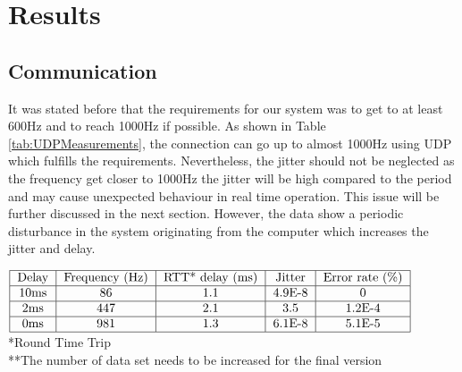 \section{Results}

\subsection{Communication}

 It was stated before that the requirements for our system was to get to at least 600Hz and to reach 1000Hz if possible. As shown in Table \ref{tab:UDPMeasurements}, the connection can go up to almost 1000Hz using UDP which fulfills the requirements. Nevertheless, the jitter should not be neglected as the frequency get closer to 1000Hz the jitter will be high compared to the period and may cause unexpected behaviour in real time operation. This issue will be further discussed in the next section. However, the data show a periodic disturbance in the system originating from the computer which increases the jitter and delay. %


\begin{table}[!t]
  $\begin{tabular}{|c|c|c|c|c|c|}
    \hline
    \text{Delay} & \text{Frequency (Hz)} & \text{RTT* delay (ms)} & \text{Jitter} & \text{Error rate (\%)}\\
    \hline
    10ms & 86 & 1.1 & 4.9E-8 & 0 \\
    \hline
    2ms & 447 & 2.1 & 3.5 & 1.2E-4 \\
    \hline
    0ms & 981 & 1.3 & 6.1E-8 & 5.1E-5 \\
    \hline
  \end{tabular}$
  *Round Time Trip\\
  **The number of data set needs to be increased for the final version
  \caption{UDP**}
  \label{tab:UDPMeasurements}
\end{table}



